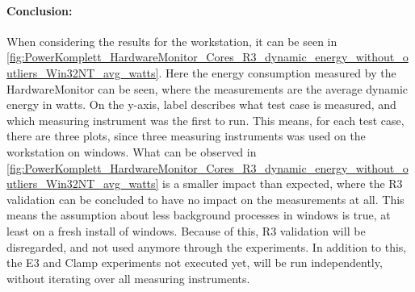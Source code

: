 \paragraph{Conclusion:} When considering the results for the workstation, it can be seen in \cref{fig:PowerKomplett_HardwareMonitor_Cores_R3_dynamic_energy_without_outliers_Win32NT_avg_watts}. Here the energy consumption measured by the HardwareMonitor can be seen, where the measurements are the average dynamic energy in watts. On the y-axis, label describes what test case is measured, and which measuring instrument was the first to run. This means, for each test case, there are three plots, since three measuring instruments was used on the workstation on windows. What can be observed in \cref{fig:PowerKomplett_HardwareMonitor_Cores_R3_dynamic_energy_without_outliers_Win32NT_avg_watts} is a smaller impact than expected, where the R3 validation can be concluded to have no impact on the measurements at all. This means the assumption about less background processes in windows is true, at least on a fresh install of windows. Because of this, R3 validation will be disregarded, and not used anymore through the experiments. In addition to this, the E3 and Clamp experiments not executed yet, will be run independently, without iterating over all measuring instruments.

